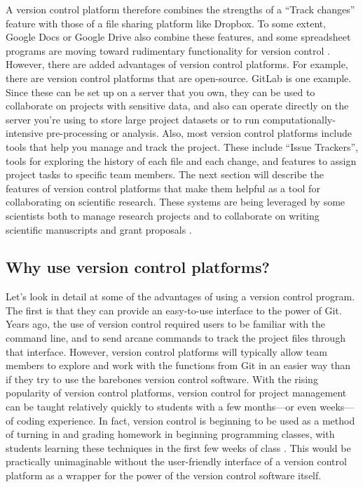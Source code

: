 \documentclass[]{tufte-book}
\begin{document}
A version control platform therefore combines the strengths of a ``Track changes''
feature with those of a file sharing platform like Dropbox. To some extent,
Google Docs or Google Drive also combine these features, and some spreadsheet
programs are moving toward rudimentary functionality for version control
\citep{birch2018future}. However, there are added advantages of version control
platforms. For example, there are version control platforms that are
open-source. GitLab is one example. Since these can be set up on a server that
you own, they can be used to collaborate on projects with sensitive data, and
also can operate directly on the server you're using to store large
project datasets or to run computationally-intensive pre-processing or analysis.
Also, most version control platforms include tools that help you manage and
track the project. These include ``Issue Trackers'', tools for exploring the
history of each file and each change, and features to assign project tasks to
specific team members. The next section will describe the features of version
control platforms that make them helpful as a tool for collaborating on
scientific research. These systems are being leveraged by some scientists both
to manage research projects and to collaborate on writing scientific manuscripts
and grant proposals \citep{perez2016ten}.

\subsection{Why use version control platforms?}\label{why-use-version-control-platforms}

Let's look in detail at some of the advantages of using a version control
program. The first is that they can provide an easy-to-use interface to the
power of Git. Years ago, the use of version control required users to be
familiar with the command line, and to send arcane commands to track the project
files through that interface. However, version control platforms will typically
allow team members to explore and work with the functions from Git in an easier
way than if they try to use the barebones version control software. With the
rising popularity of version control platforms, version control for project
management can be taught relatively quickly to students with a few months---or
even weeks---of coding experience. In fact, version control is beginning to be
used as a method of turning in and grading homework in beginning programming
classes, with students learning these techniques in the first few weeks of class
\citep{beckman2021implementing}. This would be practically unimaginable without the
user-friendly interface of a version control platform as a wrapper for the power
of the version control software itself.
\end{document}
